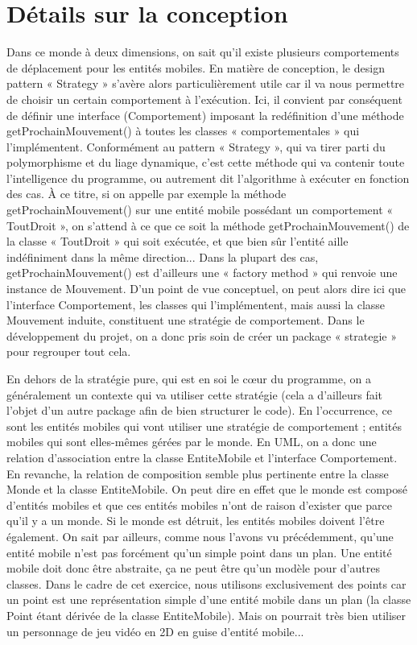 \documentclass[a4paper,10pt]{report}
\begin{document}
\clearpage

\section*{Détails sur la conception}

Dans ce monde à deux dimensions, on sait qu'il existe plusieurs comportements de déplacement pour les entités mobiles. En matière de conception, le design pattern « Strategy » s'avère alors particulièrement utile car il va nous permettre de choisir un certain comportement à l'exécution. Ici, il convient par conséquent de définir une interface (Comportement) imposant la redéfinition d'une méthode getProchainMouvement() à toutes les classes « comportementales » qui l'implémentent. Conformément au pattern « Strategy », qui va tirer parti du polymorphisme et du liage dynamique, c'est cette méthode qui va contenir toute l'intelligence du programme, ou autrement dit l'algorithme à exécuter en fonction des cas. À ce titre, si on appelle par exemple la méthode getProchainMouvement() sur une entité mobile possédant un comportement « ToutDroit », on s'attend à ce que ce soit la méthode getProchainMouvement() de la classe « ToutDroit » qui soit exécutée, et que bien sûr l'entité aille indéfiniment dans la même direction... Dans la plupart des cas, getProchainMouvement() est d'ailleurs une « factory method » qui renvoie une instance de Mouvement.
D'un point de vue conceptuel, on peut alors dire ici que l'interface Comportement, les classes qui l'implémentent, mais aussi la classe Mouvement induite, constituent une stratégie de comportement. Dans le développement du projet, on a donc pris soin de créer un package « strategie » pour regrouper tout cela.

En dehors de la stratégie pure, qui est en soi le c\oe ur du programme, on a généralement un contexte qui va utiliser cette stratégie (cela a d'ailleurs fait l'objet d'un autre package afin de bien structurer le code). En l'occurrence, ce sont les entités mobiles qui vont utiliser une stratégie de comportement ; entités mobiles qui sont elles-mêmes gérées par le monde. En UML, on a donc une relation d'association entre la classe EntiteMobile et l'interface Comportement. En revanche, la relation de composition semble plus pertinente entre la classe Monde et la classe EntiteMobile. On peut dire en effet que le monde est composé d'entités mobiles et que ces entités mobiles n'ont de raison d'exister que parce qu'il y a un monde. Si le monde est détruit, les entités mobiles doivent l'être également. On sait par ailleurs, comme nous l'avons vu précédemment, qu'une entité mobile n'est pas forcément qu'un simple point dans un plan. Une entité mobile doit donc être abstraite, ça ne peut être qu'un modèle pour d'autres classes. Dans le cadre de cet exercice, nous utilisons exclusivement des points car un point est une représentation simple d'une entité mobile dans un plan (la classe Point étant dérivée de la classe EntiteMobile). Mais on pourrait très bien utiliser un personnage de jeu vidéo en 2D en guise d'entité mobile...
\end{document}
